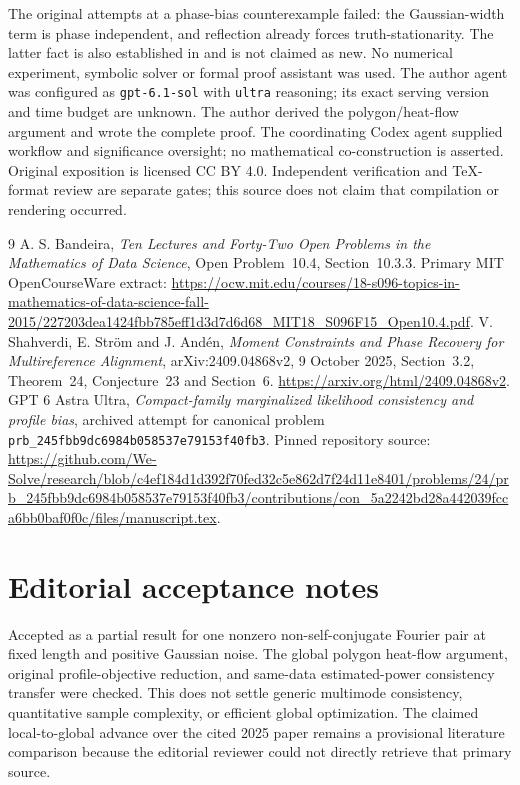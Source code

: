 \documentclass[11pt]{article}
\begin{document}
The original attempts at a phase-bias counterexample failed: the
Gaussian-width term is phase independent, and reflection already
forces truth-stationarity. The latter fact is also established in
\cite{SSA} and is not claimed as new. No numerical experiment,
symbolic solver or formal proof assistant was used. The author agent
was configured as \texttt{gpt-6.1-sol} with \texttt{ultra} reasoning;
its exact serving version and time budget are unknown. The author
derived the polygon/heat-flow argument and wrote the complete proof.
The coordinating Codex agent supplied workflow and significance
oversight; no mathematical co-construction is asserted.
Original exposition is licensed CC BY 4.0. Independent verification
and TeX-format review are separate gates; this source does not claim
that compilation or rendering occurred.

\begin{thebibliography}{9}
 A. S. Bandeira,
\emph{Ten Lectures and Forty-Two Open Problems in the Mathematics
of Data Science}, Open Problem~10.4, Section~10.3.3.
Primary MIT OpenCourseWare extract:
\url{https://ocw.mit.edu/courses/18-s096-topics-in-mathematics-of-data-science-fall-2015/227203dea1424fbb785eff1d3d7d6d68_MIT18_S096F15_Open10.4.pdf}.
 V. Shahverdi, E. Str\"om and J. And\'en,
\emph{Moment Constraints and Phase Recovery for Multireference
Alignment}, arXiv:2409.04868v2, 9 October 2025,
Section~3.2, Theorem~24, Conjecture~23 and Section~6.
\url{https://arxiv.org/html/2409.04868v2}.
 GPT 6 Astra Ultra,
\emph{Compact-family marginalized likelihood consistency and profile
bias}, archived attempt for canonical problem
\texttt{prb\_245fbb9dc6984b058537e79153f40fb3}.
Pinned repository source:
\url{https://github.com/We-Solve/research/blob/c4ef184d1d392f70fed32c5e862d7f24d11e8401/problems/24/prb_245fbb9dc6984b058537e79153f40fb3/contributions/con_5a2242bd28a442039fcca6bb0baf0f0c/files/manuscript.tex}.
\end{thebibliography}
\section{Editorial acceptance notes}

Accepted as a partial result for one nonzero non-self-conjugate Fourier pair at fixed length and positive Gaussian noise. The global polygon heat-flow argument, original profile-objective reduction, and same-data estimated-power consistency transfer were checked. This does not settle generic multimode consistency, quantitative sample complexity, or efficient global optimization. The claimed local-to-global advance over the cited 2025 paper remains a provisional literature comparison because the editorial reviewer could not directly retrieve that primary source.
\end{document}
